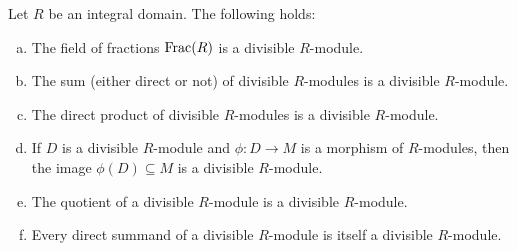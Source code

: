 \begin{proposition}
    \label{prop:properties-divisible-modules}
    Let \(R\) be an integral domain. The following holds:
    \begin{enumerate}[(a)]\setlength\itemsep{0em}
        \item The field of fractions \(\operatorname{Frac}(R)\) is a divisible \(R\)-module.

        \item The sum (either direct or not) of divisible \(R\)-modules is a divisible
              \(R\)-module.

        \item The direct product of divisible \(R\)-modules is a divisible \(R\)-module.

        \item If \(D\) is a divisible \(R\)-module and \(\phi: D \to M\) is a morphism
              of \(R\)-modules, then the image \(\phi(D) \subseteq M\) is a divisible
              \(R\)-module.

        \item The quotient of a divisible \(R\)-module is a divisible \(R\)-module.

        \item Every direct summand of a divisible \(R\)-module is itself a divisible
              \(R\)-module.
    \end{enumerate}
\end{proposition}

